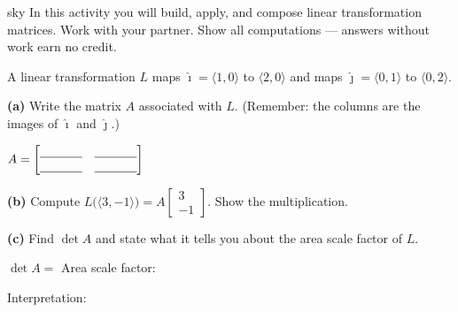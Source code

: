 \documentclass[10pt]{article}
\begin{document}
\namepartnerperiod

\vspace{0.08in}

\begin{scenariobox}{sky}
\small
In this activity you will build, apply, and compose linear transformation matrices.
Work with your partner. Show all computations --- answers without work earn no credit.
\end{scenariobox}

\vspace{0.08in}

\begin{tcolorbox}[colback=white, colframe=black!40,
    title=\textbf{Tier R --- Reading the Transformation Matrix},
    fonttitle=\bfseries, arc=2mm, left=3mm, right=3mm, top=2mm, bottom=2mm]
\small

A linear transformation $L$ maps $\hat{\imath}=\langle1,0\rangle$ to $\langle2,0\rangle$
and maps $\hat{\jmath}=\langle0,1\rangle$ to $\langle0,2\rangle$.

\vspace{0.08in}
\textbf{(a)} Write the matrix $A$ associated with $L$.
(Remember: the columns are the images of $\hat{\imath}$ and $\hat{\jmath}$.)

\vspace{0.06in}
\hspace{1em}
$A = \begin{bmatrix}\blank{1.2cm}&\blank{1.2cm}\\\blank{1.2cm}&\blank{1.2cm}\end{bmatrix}$

\vspace{0.12in}
\textbf{(b)} Compute $L\bigl(\langle3,-1\rangle\bigr) = A\begin{bmatrix}3\\-1\end{bmatrix}$.
Show the multiplication.


\vspace{0.06in}
\textbf{(c)} Find $\det A$ and state what it tells you about the area scale factor of $L$.

\vspace{0.06in}
\hspace{1em} $\det A = $ \blank{2.5cm} \qquad Area scale factor: \blank{2.5cm}

\vspace{0.06in}
\hspace{1em} Interpretation: \blank{8cm}

\end{tcolorbox}
\end{document}
